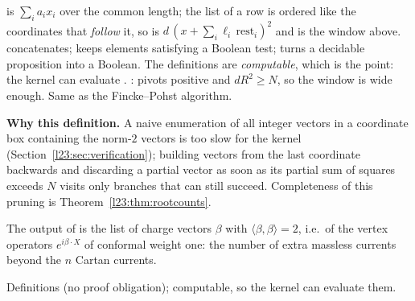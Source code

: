 \begin{dictionary}
 is $\sum_ia_ix_i$ over the common length; the list  of a row is ordered like the coordinates that
\emph{follow} it, so  is $d\,(x+\sum_i\ell_i\,\mathrm{rest}_i)^2$ and  is the window above.
 concatenates;  keeps elements satisfying a Boolean test;  turns a decidable proposition
into a Boolean. The definitions are \emph{computable}, which is the point: the kernel can evaluate . :
pivots positive and $dR^2\ge N$, so the window is wide enough. Same as the Fincke--Pohst algorithm.
\end{dictionary}

\textbf{Why this definition.} A naive enumeration of all integer vectors in a coordinate box containing the norm-$2$ vectors is too
slow for the kernel (Section~\ref{l23:sec:verification}); building vectors from the last coordinate backwards and discarding a partial
vector as soon as its partial sum of squares exceeds $N$ visits only branches that can still succeed. Completeness of this pruning is
Theorem~\ref{l23:thm:rootcounts}.

\begin{physics}
The output of  is the list of charge vectors $\beta$ with $\langle\beta,\beta\rangle=2$, i.e.\ of the vertex operators
$e^{i\beta\cdot X}$ of conformal weight one: the number of extra massless currents beyond the $n$ Cartan currents.
\end{physics}

\begin{status}
Definitions (no proof obligation); computable, so the kernel can evaluate them.
\end{status}

